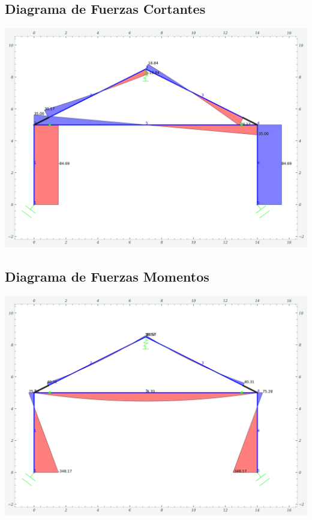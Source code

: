 \subsection{Diagrama de Fuerzas Cortantes}
\includegraphics[width=1\textwidth]{img/diag_cortantes.png}

\subsection{Diagrama de Fuerzas Momentos}
\includegraphics[width=1\textwidth]{img/diag_momentos.png}

